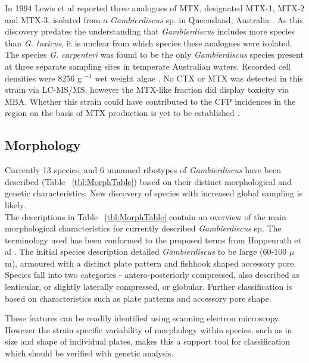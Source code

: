 \documentclass[12pt]{article}
\begin{document}
In 1994 Lewis et al reported three analogues of MTX, designated MTX-1, MTX-2 and MTX-3, isolated from a \emph{Gambierdiscus} sp. in Queensland, Australia \cite{holmes1994purification}. As this discovery predates the understanding that \emph{Gambierdiscus} includes more species than \emph{G. toxicus}, it is unclear from which species these analogues were isolated.  \\

The species \emph{G. carpenteri} was found to be the only \emph{Gambierdiscus} species present at three separate sampling sites in temperate Australian waters. Recorded cell densities were 8256 g $^{-1}$ wet weight algae \cite{kohli2014high}. No CTX or MTX was detected in this strain via LC-MS/MS, however the MTX-like fraction did display toxicity via MBA. Whether this strain could have contributed to the CFP incidences in the region on the basis of MTX production is yet to be established  \cite{kohli2014high}. 

\subsection{Morphology}

Currently 13 species, and 6 unnamed ribotypes of \emph{Gambierdiscus} have been described (Table ~\ref{tbl:MorphTable}) based on their distinct morphological and genetic characteristics. New discovery of species with increased global sampling is likely. \\

The descriptions in Table ~\ref{tbl:MorphTable} contain an overview of the main morphological characteristics for currently described \emph{Gambierdiscus} sp. The terminology used has been conformed to the proposed terms from Hoppenrath et al \cite{hoppenrath2013taxonomy}. The initial species description detailed \emph{Gambierdiscus} to be large (60-100 $\mu$m), armoured with a distinct plate pattern and fishhook shaped accessory pore. Species fall into two categories - antero-posteriorly compressed, also described as lenticular, or slightly laterally compressed, or globular. Further classification is based on characteristics such as plate patterns and accessory pore shape. %

These features can be readily identified using scanning electron microscopy. However the strain specific variability of morphology within species, such as in size and shape of individual plates, makes this a support tool for classification which should be verified with genetic analysis. \\
\end{document}
